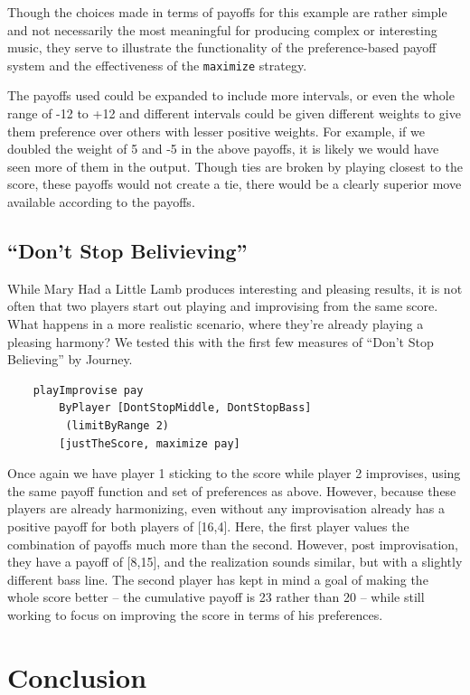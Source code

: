 \documentclass{article}
\begin{document}
Though the choices made in terms of payoffs for this example are rather
simple and not necessarily the most meaningful for producing complex or
interesting music, they serve to illustrate the functionality of the
preference-based payoff system and the effectiveness of the \texttt{maximize}
strategy.

The payoffs used could be expanded to include more intervals, or even
the whole range of -12 to +12 and different intervals could be given
different weights to give them preference over others with lesser
positive weights. For example, if we doubled the weight of 5 and -5 in
the above payoffs, it is likely we would have seen more of them in the
output. Though ties are broken by playing closest to the score, these
payoffs would not create a tie, there would be a clearly superior move
available according to the payoffs.

\subsection{``Don't Stop Belivieving''}

While Mary Had a Little Lamb produces interesting and pleasing results,
it is not often that two players start out playing and improvising from
the same score. What happens in a more realistic scenario, where they're
already playing a pleasing harmony? We tested this with the first few
measures of ``Don't Stop Believing'' by Journey.

\begin{verbatim}
    playImprovise pay 
        ByPlayer [DontStopMiddle, DontStopBass]
         (limitByRange 2) 
        [justTheScore, maximize pay]
\end{verbatim}

Once again we have player 1 sticking to the score while player 2
improvises, using the same payoff function and set of preferences as
above. However, because these players are already harmonizing, 
even without any improvisation already has a positive payoff for both
players of {[}16,4{]}. Here, the first player values the combination of
payoffs much more than the second. However, post improvisation, they
have a payoff of {[}8,15{]}, and the realization sounds similar, but
with a slightly different bass line. The second player has kept in mind
a goal of making the whole score better -- the cumulative payoff is 23
rather than 20 -- while still working to focus on improving the score in
terms of his preferences.

\section{Conclusion}
\end{document}
